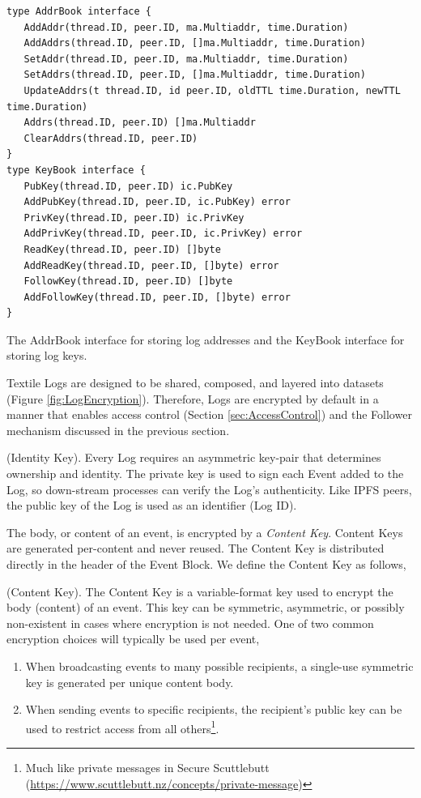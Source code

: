 \documentclass{textile}
\begin{document}
\begin{example}[!b]
\begin{lstlisting}
type AddrBook interface {
   AddAddr(thread.ID, peer.ID, ma.Multiaddr, time.Duration)
   AddAddrs(thread.ID, peer.ID, []ma.Multiaddr, time.Duration)
   SetAddr(thread.ID, peer.ID, ma.Multiaddr, time.Duration)
   SetAddrs(thread.ID, peer.ID, []ma.Multiaddr, time.Duration)
   UpdateAddrs(t thread.ID, id peer.ID, oldTTL time.Duration, newTTL time.Duration)
   Addrs(thread.ID, peer.ID) []ma.Multiaddr
   ClearAddrs(thread.ID, peer.ID)
}
type KeyBook interface {
   PubKey(thread.ID, peer.ID) ic.PubKey
   AddPubKey(thread.ID, peer.ID, ic.PubKey) error
   PrivKey(thread.ID, peer.ID) ic.PrivKey
   AddPrivKey(thread.ID, peer.ID, ic.PrivKey) error
   ReadKey(thread.ID, peer.ID) []byte
   AddReadKey(thread.ID, peer.ID, []byte) error
   FollowKey(thread.ID, peer.ID) []byte
   AddFollowKey(thread.ID, peer.ID, []byte) error
}
\end{lstlisting}
\caption{The AddrBook interface for storing log addresses and the KeyBook interface for storing log keys.}
\label{ex:KeyBook}
\end{example} 


Textile Logs are designed to be shared, composed, and layered into datasets (Figure \ref{fig:LogEncryption}). Therefore, Logs are encrypted by default in a manner that enables access control (Section  \ref{sec:AccessControl}) and the Follower mechanism discussed in the previous section.

\begin{definition}
(Identity Key). Every Log requires an asymmetric key-pair that determines ownership and identity. The private key is used to sign each Event added to the Log, so down-stream processes can verify the Log's authenticity. Like IPFS peers, the public key of the Log is used as an identifier (Log ID).
\end{definition}

The body, or content of an event, is encrypted by a \emph{Content Key}. Content Keys are generated per-content and never reused. The Content Key is distributed directly in the header of the Event Block. We define the Content Key as follows,

\begin{definition}
(Content Key). The Content Key is a variable-format key used to encrypt the body (content) of an event. This key can be symmetric, asymmetric, or possibly non-existent in cases where encryption is not needed. One of two common encryption choices will typically be used per event, 
\begin{enumerate}
\item When broadcasting events to many possible recipients, a single-use symmetric key is generated per unique content body.
\item When sending events to specific recipients, the recipient's public key can be used to restrict access from all others\footnote{Much like private messages in Secure Scuttlebutt (\url{https://www.scuttlebutt.nz/concepts/private-message})}.
\end{enumerate}
\end{definition}
\end{document}
